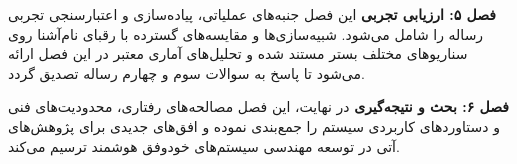 \documentclass[oneside,openany,phd]{TMU-Thesis}
\begin{document}
\textbf{فصل ۵: ارزیابی تجربی}
این فصل جنبه‌های عملیاتی، پیاده‌سازی و اعتبارسنجی تجربی رساله را شامل می‌شود. شبیه‌سازی‌ها و مقایسه‌های گسترده با رقبای نام‌آشنا روی سناریوهای مختلف بستر  مستند شده و تحلیل‌های آماری معتبر در این فصل ارائه می‌شود تا پاسخ به سوالات سوم و چهارم رساله تصدیق گردد.

\textbf{فصل ۶: بحث و نتیجه‌گیری}
در نهایت، این فصل مصالحه‌های رفتاری، محدودیت‌های فنی و دستاوردهای کاربردی سیستم را جمع‌بندی نموده و افق‌های جدیدی برای پژوهش‌های آتی در توسعه مهندسی سیستم‌های خودوفق هوشمند ترسیم می‌کند.




\ifstandalone


\fi
\end{document}

